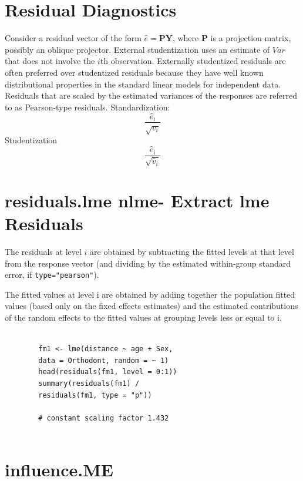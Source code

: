\documentclass[12pt, a4paper]{report}
\theoremstyle{plain}
\theoremstyle{definition}
\theoremstyle{remark}
\begin{document}
	
	\section{Residual Diagnostics}
	
	Consider a residual vector of the form $\hat{e} = \boldsymbol{PY} $, where $\boldsymbol{P}$ is a projection matrix, possibly an oblique projector.
	External studentization uses an estimate of $Var$ that does not involve the $i$th observation.
	Externally studentized residuals are often preferred over studentized residuals because they have well known distributional
	properties in the standard linear models for independent data.
	Residuals that are scaled by the estimated variances of the responses are referred to as Pearson-type residuals.
	Standardization: \[ \frac{\hat{e}_i}{\sqrt{v_i}}\]
	Studentization \[ \frac{\hat{e}_i}{\sqrt{\hat{v}_i}}\]
	
	\section{residuals.lme {nlme}- Extract lme Residuals}
	
	The residuals at level $i$ are obtained by subtracting the fitted levels at that level from the response vector (and dividing by the estimated within-group standard error, if \texttt{type="pearson"}). 
	
	The fitted values at level i are obtained by adding together the population fitted values (based only on the fixed effects estimates) and the estimated contributions of the random effects to the fitted values at grouping levels less or equal to i.
	
	
	\begin{framed}
		\begin{verbatim}
		
		fm1 <- lme(distance ~ age + Sex, 
		data = Orthodont, random = ~ 1)
		head(residuals(fm1, level = 0:1))
		summary(residuals(fm1) /
		residuals(fm1, type = "p")) 
		
		# constant scaling factor 1.432
		
		\end{verbatim}
	\end{framed}
	
	\section{influence.ME}
	
\end{document}

